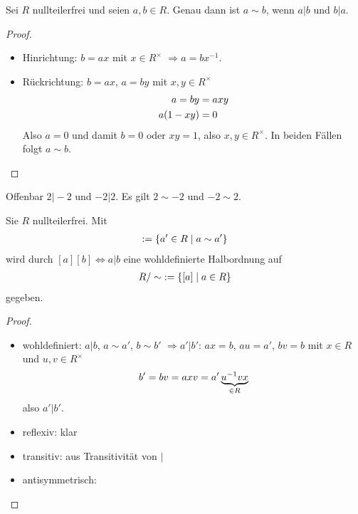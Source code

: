 \begin{lemma}
	Sei $R$ nullteilerfrei und seien $a,b\in R$. Genau dann ist $a\sim b$, wenn $a\vert b$ und $b\vert a$.
\end{lemma}
\begin{proof}
	\begin{itemize}
		\item Hinrichtung: $b=ax$ mit $x\in R^\times$ $\Rightarrow a=bx^{-1}$.
		\item Rückrichtung: $b=ax$, $a=by$ mit $x,y\in R^\times$
		\begin{align}
			a=by&=axy \notag \\
			a(1-xy)&= 0 \notag
		\end{align}
		Also $a=0$ und damit $b=0$ oder $xy=1$, also $x,y\in R^\times$. In beiden Fällen folgt $a\sim b$.
	\end{itemize}
\end{proof}

\begin{*example}
	Offenbar $2\vert -2$ und $-2\vert 2$. Es gilt $2\sim -2$ und $-2\sim 2$.
\end{*example}

\begin{proposition}
	Sie $R$ nullteilerfrei. Mit 
	\begin{align}
		[a] := \{a'\in R\mid a\sim a'\}\notag
	\end{align}
	wird durch $[a][b]\iff a\vert b$ eine wohldefinierte Halbordnung auf 
	\begin{align}
		R/\sim\; := \{[a]\mid a\in R\}\notag
	\end{align}
	gegeben.
\end{proposition}
\begin{proof}
	\begin{itemize}
		\item wohldefiniert: $a\vert b$, $a\sim a'$, $b\sim b'$ $\Rightarrow a'\vert b'$: $ax=b$, $au=a'$, $bv=b$ mit $x\in R$ und $u,v\in R^\times$
		\begin{align}
			b'=bv=axv=a'\underbrace{u^{-1}vx}_{\in R}\notag
		\end{align}
		also $a'\vert b'$.
		\item reflexiv: klar
		\item transitiv: aus Transitivität von $\vert$
		\item antisymmetrisch: 
	\end{itemize}
\end{proof}

